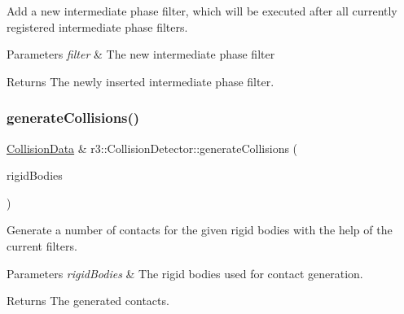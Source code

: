 Add a new intermediate phase filter, which will be executed after all currently registered intermediate phase filters. 


\begin{DoxyParams}{Parameters}
{\em filter} & The new intermediate phase filter \\
\hline
\end{DoxyParams}
\begin{DoxyReturn}{Returns}
The newly inserted intermediate phase filter. 
\end{DoxyReturn}
\mbox{\label{classr3_1_1_collision_detector_a58a1bd9705f241e4c137458bed35f596}} 
\subsubsection{\texorpdfstring{generate\+Collisions()}{generateCollisions()}}
{\footnotesize\ttfamily \mbox{\hyperlink{classr3_1_1_collision_data}{Collision\+Data}} \& r3\+::\+Collision\+Detector\+::generate\+Collisions (\begin{DoxyParamCaption}\item[{const std\+::vector$<$ \mbox{\hyperlink{classr3_1_1_rigid_body}{Rigid\+Body}} $\ast$$>$ \&}]{rigid\+Bodies }\end{DoxyParamCaption})}



Generate a number of contacts for the given rigid bodies with the help of the current filters. 


\begin{DoxyParams}{Parameters}
{\em rigid\+Bodies} & The rigid bodies used for contact generation. \\
\hline
\end{DoxyParams}
\begin{DoxyReturn}{Returns}
The generated contacts. 
\end{DoxyReturn}
\mbox{\label{classr3_1_1_collision_detector_aa4d1c9560f806496b2215ddc623a1387}} 
